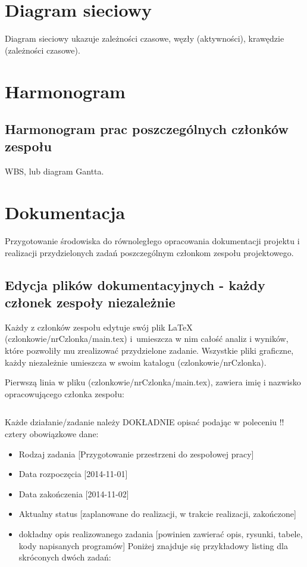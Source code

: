 \section{Diagram sieciowy}
Diagram sieciowy ukazuje zależności czasowe, węzły (aktywności), krawędzie (zależności czasowe).


\section{Harmonogram}
\subsection{Harmonogram prac poszczególnych członków zespołu}
WBS, lub diagram Gantta.


\section{Dokumentacja}
Przygotowanie środowiska do równoległego opracowania dokumentacji projektu i realizacji przydzielonych zadań poszczególnym członkom zespołu projektowego.

\subsection[Edycja plików dokumentacyjnych]{Edycja plików dokumentacyjnych - każdy członek zespoły niezależnie}
Każdy z członków zespołu edytuje swój plik \LaTeX{} (czlonkowie/nrCzlonka/main.tex) i~umieszcza w nim całość analiz i wyników, które pozwoliły mu zrealizować przydzielone zadanie. Wszystkie pliki graficzne, każdy niezależnie umieszcza w swoim katalogu (czlonkowie/nrCzlonka).

Pierwszą linia w pliku (czlonkowie/nrCzlonka/main.tex), zawiera imię i nazwisko opracowującego członka zespołu:
\begin{lstlisting}
\end{lstlisting}

Każde działanie/zadanie należy DOKŁADNIE opisać podając w poleceniu \s!\zadanieprojektowe! cztery obowiązkowe dane:
\begin{itemize}
\item Rodzaj zadania [Przygotowanie przestrzeni do zespołowej pracy]
\item Data rozpoczęcia [2014-11-01]
\item Data zakończenia [2014-11-02]
\item Aktualny status [zaplanowane do realizacji, w trakcie realizacji, zakończone]
\item dokładny opis realizowanego zadania [powinien zawierać opis, rysunki, tabele, kody napisanych programów]
Poniżej znajduje się przykładowy listing dla skróconych dwóch zadań: 
\end{itemize}


